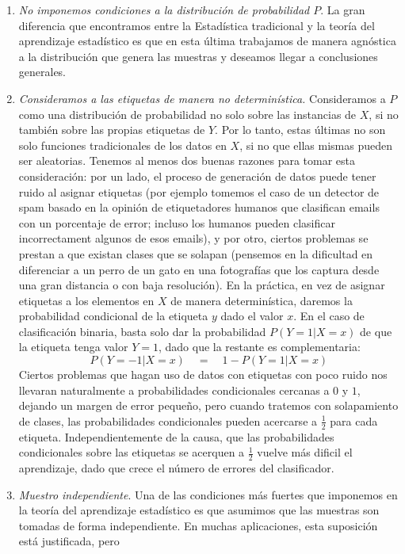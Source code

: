 \documentclass{report}
\begin{document}
\begin{enumerate}
    \item \textit{No imponemos condiciones a la distribución de probabilidad $P$}. La gran diferencia que encontramos entre la Estadística
    tradicional y la teoría del aprendizaje estadístico es que en esta última trabajamos de manera agnóstica a la distribución
    que genera las muestras y deseamos llegar a conclusiones generales.
    \item \textit{Consideramos a las etiquetas de manera no determinística.} Consideramos a $P$ como una distribución de probabilidad
    no solo sobre las instancias de $X$, si no también sobre las propias etiquetas de $Y$. Por lo tanto, estas últimas no son solo
    funciones tradicionales de los datos en $X$, si no que ellas mismas pueden ser aleatorias. Tenemos al menos dos buenas razones
    para tomar esta consideración: por un lado, el proceso de generación de datos puede tener ruido al asignar etiquetas (por ejemplo
    tomemos el caso de un detector de spam basado en la opinión de etiquetadores humanos que clasifican emails con un porcentaje de error; incluso
    los humanos pueden clasificar incorrectament algunos de esos emails), y por otro, ciertos problemas se prestan a que existan
    clases que se solapan (pensemos en la dificultad en diferenciar a un perro de un gato en una fotografías que los captura desde
    una gran distancia o con baja resolución).
    En la práctica, en vez de asignar etiquetas a los elementos en $X$ de manera determinística, daremos la probabilidad condicional
    de la etiqueta $y$ dado el valor $x$. En el caso de clasificación binaria, basta solo dar la probabilidad $P(Y=1|X=x)$ de que la etiqueta
    tenga valor $Y=1$, dado que la restante es complementaria:
    \[
    P(Y=-1|X=x) \quad = \quad 1 - P(Y=1|X=x)
    \]
    Ciertos problemas que hagan uso de datos con etiquetas con poco ruido nos llevaran naturalmente a probabilidades condicionales cercanas
    a $0$ y $1$, dejando un margen de error pequeño, pero cuando tratemos con solapamiento de clases, las probabilidades condicionales
    pueden acercarse a $\frac{1}{2}$ para cada etiqueta. Independientemente de la causa, que las probabilidades condicionales sobre
    las etiquetas se acerquen a $\frac{1}{2}$ vuelve más dificil el aprendizaje, dado que crece el número de errores del clasificador.
    \item \textit{Muestro independiente}. Una de las condiciones más fuertes que imponemos en la teoría del aprendizaje estadístico es
    que asumimos que las muestras son tomadas de forma independiente. En muchas aplicaciones, esta suposición está justificada, pero

\end{enumerate}
\end{document}
